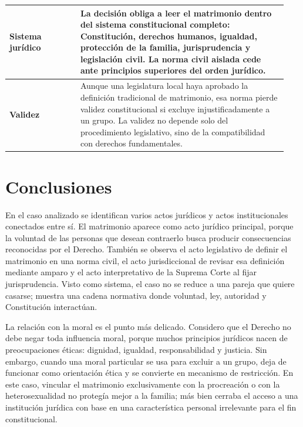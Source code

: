 \documentclass[
	spanish,
	letterpaper, oneside
]{article}
\begin{document}
\begin{longtable}{@{}p{0.24\linewidth}p{0.70\linewidth}@{}}
\textbf{Sistema jurídico} &
La decisión obliga a leer el matrimonio dentro del sistema constitucional completo: Constitución, derechos humanos, igualdad, protección de la familia, jurisprudencia y legislación civil. La norma civil aislada cede ante principios superiores del orden jurídico. \\
\midrule

\textbf{Validez} &
Aunque una legislatura local haya aprobado la definición tradicional de matrimonio, esa norma pierde validez constitucional si excluye injustificadamente a un grupo. La validez no depende solo del procedimiento legislativo, sino de la compatibilidad con derechos fundamentales. \\

\end{longtable}
\endgroup

\section{Conclusiones}

En el caso analizado se identifican varios actos jurídicos y actos institucionales conectados entre sí. El matrimonio aparece como acto jurídico principal, porque la voluntad de las personas que desean contraerlo busca producir consecuencias reconocidas por el Derecho. También se observa el acto legislativo de definir el matrimonio en una norma civil, el acto jurisdiccional de revisar esa definición mediante amparo y el acto interpretativo de la Suprema Corte al fijar jurisprudencia. Visto como sistema, el caso no se reduce a una pareja que quiere casarse; muestra una cadena normativa donde voluntad, ley, autoridad y Constitución interactúan.

La relación con la moral es el punto más delicado. Considero que el Derecho no debe negar toda influencia moral, porque muchos principios jurídicos nacen de preocupaciones éticas: dignidad, igualdad, responsabilidad y justicia. Sin embargo, cuando una moral particular se usa para excluir a un grupo, deja de funcionar como orientación ética y se convierte en mecanismo de restricción. En este caso, vincular el matrimonio exclusivamente con la procreación o con la heterosexualidad no protegía mejor a la familia; más bien cerraba el acceso a una institución jurídica con base en una característica personal irrelevante para el fin constitucional.
\end{document}
